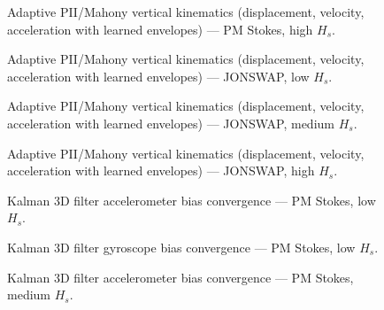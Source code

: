 \documentclass[11pt,letterpaper]{article}
\begin{document}
\begin{figure}[H]\centering
  \resizebox{\textwidth}{!}{}
  \caption{Adaptive PII/Mahony vertical kinematics (displacement, velocity, acceleration with learned envelopes) --- PM Stokes, high $H_s$.}
  \label{fig:w3d_nonkalman_pmstokes_high_zkin}
\end{figure}

\begin{figure}[H]\centering
  \resizebox{\textwidth}{!}{}
  \caption{Adaptive PII/Mahony vertical kinematics (displacement, velocity, acceleration with learned envelopes) --- JONSWAP, low $H_s$.}
  \label{fig:w3d_nonkalman_jonswap_low_zkin}
\end{figure}

\begin{figure}[H]\centering
  \resizebox{\textwidth}{!}{}
  \caption{Adaptive PII/Mahony vertical kinematics (displacement, velocity, acceleration with learned envelopes) --- JONSWAP, medium $H_s$.}
  \label{fig:w3d_nonkalman_jonswap_medium_zkin}
\end{figure}

\begin{figure}[H]\centering
  \resizebox{\textwidth}{!}{}
  \caption{Adaptive PII/Mahony vertical kinematics (displacement, velocity, acceleration with learned envelopes) --- JONSWAP, high $H_s$.}
  \label{fig:w3d_nonkalman_jonswap_high_zkin}
\end{figure}



\begin{figure}[H]\centering
  \resizebox{\textwidth}{!}{}
  \caption{Kalman 3D filter accelerometer bias convergence — PM Stokes, low $H_s$.}
  \label{fig:w3d_pmstokes_low_acc_bias}
\end{figure}

\begin{figure}[H]\centering
  \resizebox{\textwidth}{!}{}
  \caption{Kalman 3D filter gyroscope bias convergence — PM Stokes, low $H_s$.}
  \label{fig:w3d_pmstokes_low_gyro_bias}
\end{figure}

\begin{figure}[H]\centering
  \resizebox{\textwidth}{!}{}
  \caption{Kalman 3D filter accelerometer bias convergence — PM Stokes, medium $H_s$.}
  \label{fig:w3d_pmstokes_medium_acc_bias}
\end{figure}
\end{document}

